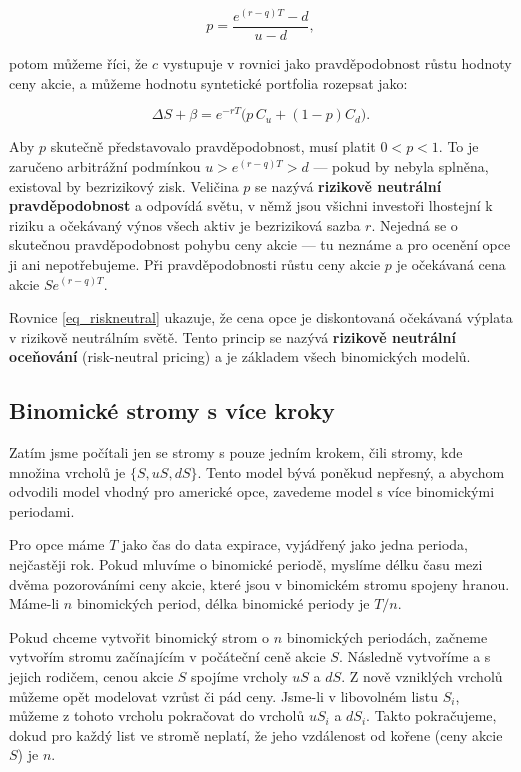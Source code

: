 \documentclass{article}
\begin{document}
\begin{equation}
  \label{probability}
  p = \frac{e^{(r - q) T} - d}{u - d},
\end{equation}

potom můžeme říci, že $c$ vystupuje v rovnici jako pravděpodobnost růstu hodnoty ceny akcie, a můžeme hodnotu syntetické portfolia rozepsat jako:

\begin{equation}
  \Delta S + \beta = e^{-rT}\bigl(p \, C_u + (1-p) C_d\bigr). \label{eq_riskneutral}
\end{equation}

Aby $p$ skutečně představovalo pravděpodobnost, musí platit $0 < p < 1$. To je zaručeno arbitrážní podmínkou $u > e^{(r - q)T} > d$ — pokud by nebyla splněna, existoval by bezrizikový zisk. Veličina $p$ se nazývá \textbf{rizikově neutrální pravděpodobnost} %
a odpovídá světu, v němž jsou všichni investoři lhostejní k riziku a očekávaný výnos všech aktiv je bezriziková sazba $r$. Nejedná se o skutečnou pravděpodobnost pohybu ceny akcie — tu neznáme a pro ocenění opce ji ani nepotřebujeme. Při pravděpodobnosti růstu ceny akcie $p$ je očekávaná cena akcie $S e^{(r-q)T}$. %

Rovnice \eqref{eq_riskneutral} ukazuje, že cena opce je diskontovaná očekávaná výplata v rizikově neutrálním světě. Tento princip se nazývá \textbf{rizikově neutrální oceňování} (risk-neutral pricing) %
a je základem všech binomických modelů. 

\subsection{Binomické stromy s více kroky}

Zatím jsme počítali jen se stromy s pouze jedním krokem, čili stromy, kde množina vrcholů je $\{S, uS, dS\}$. Tento model bývá poněkud nepřesný, a abychom odvodili model vhodný pro americké opce, zavedeme model s více binomickými periodami.

Pro opce máme $T$ jako čas do data expirace, vyjádřený jako jedna perioda, nejčastěji rok. Pokud mluvíme o binomické periodě, myslíme délku času mezi dvěma pozorováními ceny akcie, které jsou v binomickém stromu spojeny hranou. Máme-li $n$ binomických period, délka binomické periody je $T/n$. 

Pokud chceme vytvořit binomický strom o $n$ binomických periodách, začneme vytvořím stromu začínajícím v počáteční ceně akcie $S$. Následně vytvoříme a s jejich rodičem, cenou akcie $S$ spojíme vrcholy $uS$ a $dS$. Z nově vzniklých vrcholů můžeme opět modelovat vzrůst či pád ceny. Jsme-li v libovolném listu $S_i$, můžeme z tohoto vrcholu pokračovat do vrcholů $u S_i$ a $d S_i$. Takto pokračujeme, dokud pro každý list ve stromě neplatí, že jeho vzdálenost od kořene (ceny akcie $S$) je $n$.
\end{document}
